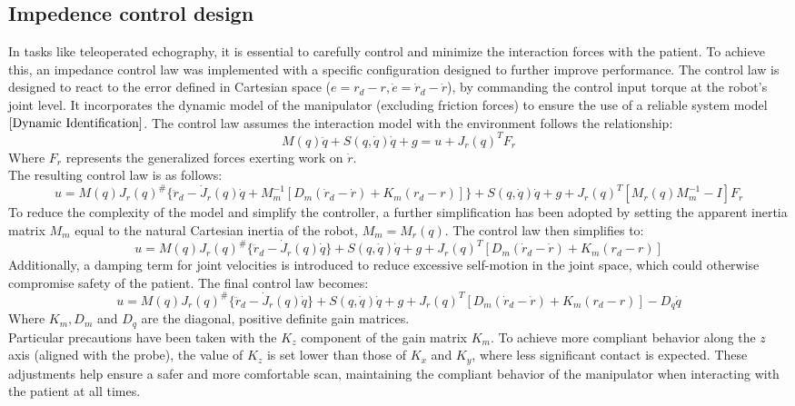 \documentclass{article}
\begin{document}
\subsection{Impedence control design}
In tasks like teleoperated echography, it is essential to carefully control and minimize the interaction forces with the patient. To achieve this, an impedance control law was implemented with a specific configuration designed to further improve performance. The control law is designed to react to the error defined in Cartesian space ($e=r_{d}-r, \dot{e}=\dot{r}_{d}-\dot{r}$), by commanding the control input torque at the robot's joint level. It incorporates the dynamic model of the manipulator (excluding friction forces) to ensure the use of a reliable system model $\cite{Dynamic Identification}$. The control law assumes the interaction model with the environment follows the relationship:
$$
M(q)\ddot{q}+S(q,\dot{q})\dot{q}+g=u+J_{r}(q)^{T}F_{r}
$$
Where $F_{r}$ represents the generalized forces exerting work on $ \dot{r}$.
\\
The resulting control law is as follows:
$$
u=M(q)J_{r}(q)^{\#}\{\ddot{r}_{d}-\dot{J}_{r}(q)\dot{q}+ M_{m}^{-1}[D_{m}(\dot{r}_{d}-\dot{r})+K_{m}(r_{d}-r)]\}+S(q,\dot{q})\dot{q}+g+J_{r}(q)^{T}[M_{r}(q)M_{m}^{-1}-I]F_{r}
$$
To reduce the complexity of the model and simplify the controller, a further simplification has been adopted by setting the apparent inertia matrix $M_{m}$ equal to the natural Cartesian inertia of the robot, $M_{m}=M_{r}(q)$. The control law then simplifies to:
$$
u=M(q)J_{r}(q)^{\#}\{\ddot{r}_{d}-\dot{J}_{r}(q)\dot{q}\}+S(q,\dot{q})\dot{q}+g+J_{r}(q)^{T}[D_{m}(\dot{r}_{d}-\dot{r})+K_{m}(r_{d}-r)]
$$
Additionally, a damping term for joint velocities is introduced to reduce excessive self-motion in the joint space, which could otherwise compromise safety of the patient. The final control law becomes:
$$
u=M(q)J_{r}(q)^{\#}\{\ddot{r}_{d}-\dot{J}_{r}(q)\dot{q}\}+S(q,\dot{q})\dot{q}+g+J_{r}(q)^{T}[D_{m}(\dot{r}_{d}-\dot{r})+K_{m}(r_{d}-r)]-D_{q}\dot{q}
$$
Where $K_{m}, D_{m}$ and $D_{q}$ are the diagonal, positive definite gain matrices.
\\
Particular precautions have been taken with the $K_{z}$ component of the gain matrix $K_{m}$. To achieve more compliant behavior along the $z$ axis (aligned with the probe), the value of $K_{z}$ is set lower than those of  $K_{x}$ and $K_{y}$, where less significant contact is expected. These adjustments help ensure a safer and more comfortable scan, maintaining the compliant behavior of the manipulator when interacting with the patient at all times.
\end{document}
